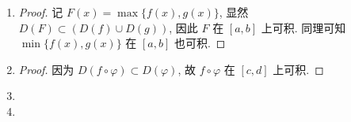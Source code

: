 \documentclass[a4paper, 11pt]{ctexart}
\begin{document}
\begin{enumerate}
\item %
    \begin{proof}
        记 $F(x) = \max\{f(x), g(x)\}$, 显然 $D(F) \subset (D(f) \cup D(g))$, 因此 $F$ 在 $[a, b]$ 上可积.
        同理可知 $\min\{f(x), g(x)\}$ 在 $[a, b]$ 也可积.
    \end{proof}
\item %
    \begin{proof}
        因为 $D(f\circ\varphi) \subset D(\varphi)$, 故 $f\circ\varphi$ 在 $[c, d]$ 上可积.
    \end{proof}
\item %
\item %
\end{enumerate}
\end{document}
